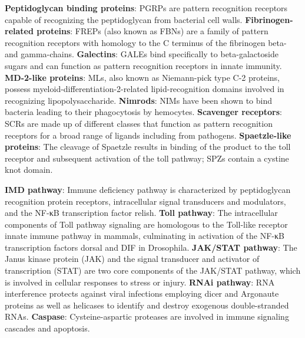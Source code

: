 \documentclass[11pt]{article}
\begin{document}
\begin{sloppypar}
\textbf{Peptidoglycan binding proteins}: PGRPs are pattern recognition receptors capable of recognizing
the peptidoglycan from bacterial cell walls. \newline
\textbf{Fibrinogen-related proteins}: FREPs (also known as FBNs) are a family of pattern recognition
receptors with homology to the C terminus of the fibrinogen beta- and gamma-chains. \newline
\textbf{Galectins}: GALEs bind specifically to beta-galactoside sugars and can function as pattern recognition receptors in innate immunity. \newline
\textbf{MD-2-like proteins}: MLs, also known as Niemann-pick type C-2 proteins, possess myeloid-differentiation-­2-related lipid-­recognition domains involved in recognizing lipopolysaccharide. \newline
\textbf{Nimrods}: NIMs have been shown to bind bacteria leading to their phagocytosis by hemocytes. \newline
\textbf{Scavenger receptors}: SCRs are made up of different classes that function as pattern recognition receptors for a broad range of ligands including from pathogens. \newline
\textbf{Spaetzle-like proteins}: The cleavage of Spaetzle results in binding of the product to the
toll receptor and subsequent activation of the toll pathway; SPZs contain a cystine knot domain. \newline
\par
\textbf{IMD pathway}: Immune deficiency pathway is characterized by peptidoglycan recognition protein receptors, intracellular signal transducers and modulators, and the NF-κB transcription factor relish. \newline
\textbf{Toll pathway}: The intracellular components of Toll pathway signaling are homologous to the Toll-like receptor innate immune pathway in mammals, culminating in activation of the NF-κB transcription factors dorsal and DIF in Drosophila. \newline
\textbf{JAK/STAT pathway}: The Janus kinase protein (JAK) and the signal transducer and activator of transcription (STAT) are two core components of the JAK/STAT pathway, which is involved in cellular responses to stress or injury. \newline
\textbf{RNAi pathway}: RNA interference protects against viral infections employing dicer and Argonaute proteins as well as helicases to identify and destroy exogenous double-­stranded RNAs. \newline
\textbf{Caspase}: Cysteine-aspartic proteases are involved in immune signaling cascades and apoptosis. \newline

\end{sloppypar}
\end{document}
